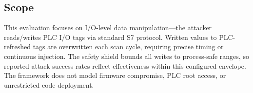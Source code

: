 \subsection{Scope}

This evaluation focuses on I/O-level data manipulation---the attacker reads/writes PLC I/O tags via standard S7 protocol. Written values to PLC-refreshed tags are overwritten each scan cycle, requiring precise timing or continuous injection. The safety shield bounds all writes to process-safe ranges, so reported attack success rates reflect effectiveness within this configured envelope. The framework does not model firmware compromise, PLC root access, or unrestricted code deployment.
